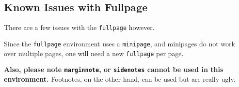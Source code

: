 \subsection{Known Issues with Fullpage}\label{Sub: Fullpage_Issues}

There are a few issues with the \texttt{fullpage} however. 
\begin{remark}
  Since the \texttt{fullpage} environment uses a \texttt{minipage}, and minipages do not work over multiple pages, one will need a new \texttt{fullpage} per page.	
\end{remark}
\begin{remark}
  \textbf{Also, please note \texttt{marginnote}, or \texttt{sidenotes} cannot be used in this environment.} Footnotes, on the other hand, can be used but are really ugly.
\end{remark}

\newpage
